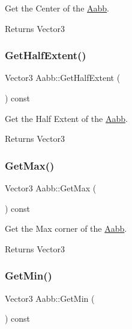 Get the Center of the \hyperlink{classAabb}{Aabb}. 

\begin{DoxyReturn}{Returns}
Vector3 
\end{DoxyReturn}
\mbox{\label{classAabb_a06b1e4e71b018b2e5969f49b460f8ae0}} 
\subsubsection{\texorpdfstring{Get\+Half\+Extent()}{GetHalfExtent()}}
{\footnotesize\ttfamily Vector3 Aabb\+::\+Get\+Half\+Extent (\begin{DoxyParamCaption}{ }\end{DoxyParamCaption}) const}



Get the Half Extent of the \hyperlink{classAabb}{Aabb}. 

\begin{DoxyReturn}{Returns}
Vector3 
\end{DoxyReturn}
\mbox{\label{classAabb_ad221f8c84e946375de4c07bdef67e157}} 
\subsubsection{\texorpdfstring{Get\+Max()}{GetMax()}}
{\footnotesize\ttfamily Vector3 Aabb\+::\+Get\+Max (\begin{DoxyParamCaption}{ }\end{DoxyParamCaption}) const}



Get the Max corner of the \hyperlink{classAabb}{Aabb}. 

\begin{DoxyReturn}{Returns}
Vector3 
\end{DoxyReturn}
\mbox{\label{classAabb_afe9a77744c815785d6b3c6fa4c3a8340}} 
\subsubsection{\texorpdfstring{Get\+Min()}{GetMin()}}
{\footnotesize\ttfamily Vector3 Aabb\+::\+Get\+Min (\begin{DoxyParamCaption}{ }\end{DoxyParamCaption}) const}




